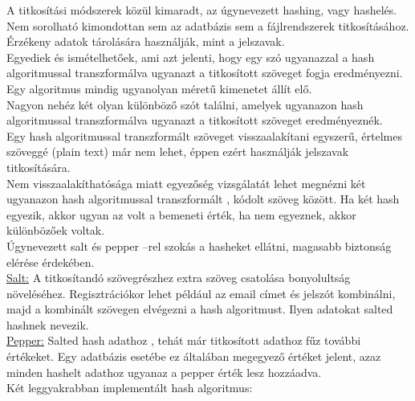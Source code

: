 \newpage {}
A titkosítási módszerek közül kimaradt, az úgynevezett hashing, vagy hashelés. Nem sorolható kimondottan sem az adatbázis sem a fájlrendszerek titkosításához. 
\vspace{5pt} \\Érzékeny adatok tárolására használják, mint a jelszavak.
\vspace{5pt} \\Egyediek és ismételhetőek, ami azt jelenti, hogy egy szó ugyanazzal a hash algoritmussal transzformálva ugyanazt a titkosított szöveget fogja eredményezni. 
\vspace{5pt} \\Egy algoritmus mindig ugyanolyan méretű kimenetet állít elő. 
\vspace{5pt} \\Nagyon nehéz két olyan különböző szót találni, amelyek ugyanazon hash algoritmussal transzformálva ugyanazt a titkosított szöveget eredményeznék.
\vspace{5pt} \\Egy hash algoritmussal transzformált szöveget visszaalakítani egyszerű, értelmes szöveggé (plain text) már nem lehet, éppen ezért használják jelszavak titkosítására.
\vspace{5pt} \\Nem visszaalakíthatósága miatt egyezőség vizsgálatát lehet megnézni két ugyanazon hash algoritmussal transzformált , kódolt szöveg között. Ha két hash egyezik, akkor ugyan az volt a bemeneti érték, ha nem egyeznek, akkor különbözőek voltak.
\vspace{5pt} \\Úgynevezett salt és pepper –rel szokás a hasheket ellátni, magasabb biztonság elérése érdekében.
\vspace{5pt} \\ \underline{Salt:} A titkosítandó szövegrészhez extra szöveg csatolása bonyolultság növeléséhez. Regisztrációkor lehet például az email címet és jelszót kombinálni, majd a kombinált szövegen elvégezni a hash algoritmust. Ilyen adatokat salted hashnek nevezik.
\vspace{5pt} \\ \underline{Pepper:} Salted hash adathoz , tehát már titkosított adathoz fűz további értékeket. Egy adatbázis esetébe ez általában megegyező értéket jelent, azaz minden hashelt adathoz ugyanaz a pepper érték lesz hozzáadva.
\vspace{25pt} \\ Két leggyakrabban implementált hash algoritmus:

